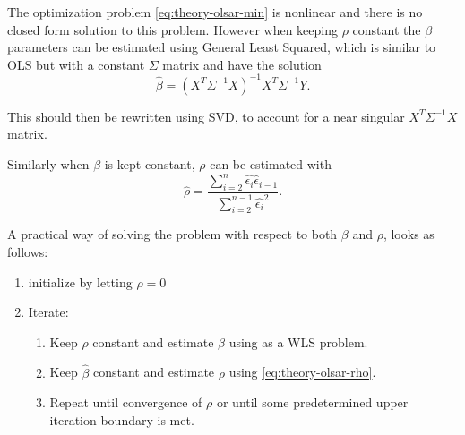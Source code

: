 The optimization problem \eqref{eq:theory-olsar-min} is nonlinear and there is no closed form solution to this problem. However when keeping $\rho$ constant the $\beta$ parameters can be estimated using  General Least Squared, which is similar to OLS but with a constant $\Sigma$ matrix and have the solution \cite[p.~38]{time-series-analysis}
\begin{equation}
\hat{\beta} = (X^T \Sigma^{-1} X)^{-1} X^T \Sigma^{-1} Y.
\end{equation}

This should then be rewritten using SVD, to account for a near singular $X^T \Sigma^{-1} X$ matrix.

Similarly when $\beta$ is kept constant, $\rho$ can be estimated with  \cite[p.~178]{autocorrelation-kousgaard}
\begin{equation}
\hat{\rho} = \frac{ \sum_{i=2}^n \hat{\epsilon_i}\hat{\epsilon}_{i-1} }{ \sum_{i=2}^{n-1} \hat{\epsilon_i}^2 }.
\label{eq:theory-olsar-rho}
\end{equation}

A practical way of solving the problem with respect to both $\beta$ and $\rho$, looks as follows:
\begin{enumerate}
\item initialize by letting $\rho=0$
\item Iterate: \begin{enumerate}
	\item Keep $\hat{\rho}$ constant and estimate $\beta$ using as a WLS problem.
	
	\item Keep $\hat{\beta}$ constant and estimate $\rho$ using \eqref{eq:theory-olsar-rho}.
	
	\item Repeat until convergence of $\rho$ or until some predetermined upper iteration boundary is met.
\end{enumerate}
\end{enumerate}
